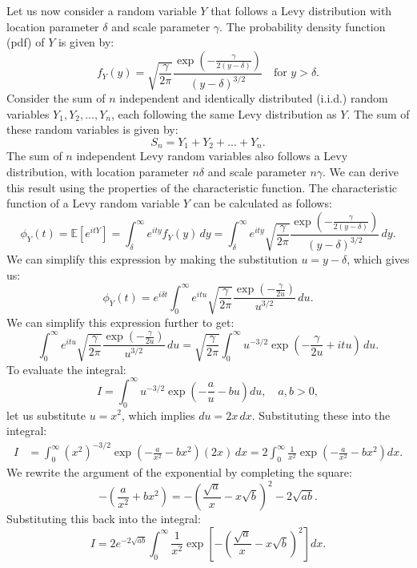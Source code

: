 \documentclass[12pt]{article}
\begin{document}
\begin{singlespace}
Let us now consider a random variable $Y$ that follows a Levy distribution with location parameter $\delta$ and scale parameter $\gamma$. The probability density function (pdf) of $Y$ is given by:
\[
f_Y(y) = \sqrt{\frac{\gamma}{2\pi}} \frac{\exp\left(-\frac{\gamma}{2(y-\delta)}\right)}{(y-\delta)^{3/2}} \quad \text{for } y > \delta.
\]
Consider the sum of $n$ independent and identically distributed (i.i.d.) random variables $Y_1, Y_2, ..., Y_n$, each following the same Levy distribution as $Y$. The sum of these random variables is given by:
\[
S_n = Y_1 + Y_2 + ... + Y_n.
\]
The sum of $n$ independent Levy random variables also follows a Levy distribution, with location parameter $n\delta$ and scale parameter $n\gamma$. We can derive this result using the properties of the characteristic function. The characteristic function of a Levy random variable $Y$ can be calculated as follows:
\[
\phi_Y(t) = \mathbb{E}[e^{itY}] = \int_{\delta}^{\infty} e^{ity} f_Y(y) \,dy = \int_{\delta}^{\infty} e^{ity} \sqrt{\frac{\gamma}{2\pi}} \frac{\exp\left(-\frac{\gamma}{2(y-\delta)}\right)}{(y-\delta)^{3/2}} \,dy.
\]
We can simplify this expression by making the substitution $u = y - \delta$, which gives us:
\[
\phi_Y(t) = e^{i\delta t} \int_{0}^{\infty} e^{itu} \sqrt{\frac{\gamma}{2\pi}} \frac{\exp\left(-\frac{\gamma}{2u}\right)}{u^{3/2}} \,du.
\]
 We can simplify this expression further to get:
\[
\int_{0}^{\infty} e^{itu} \sqrt{\frac{\gamma}{2\pi}} \frac{\exp\left(-\frac{\gamma}{2u}\right)}{u^{3/2}} \,du = \sqrt{\frac{\gamma}{2\pi}} \int_{0}^{\infty} u^{-3/2} \exp\left(-\frac{\gamma}{2u} + itu\right) \,du.
\]
To evaluate the integral:
\begin{equation}
I = \int_{0}^{\infty} u^{-3/2} \exp\left(-\frac{a}{u} - bu\right) du, \quad a, b > 0,
\end{equation}
let us substitute $u = x^2$, which implies $du = 2x \, dx$. Substituting these into the integral:
\begin{align}
I &= \int_{0}^{\infty} (x^2)^{-3/2} \exp\left(-\frac{a}{x^2} - bx^2\right) (2x) \, dx = 2 \int_{0}^{\infty} \frac{1}{x^2} \exp\left(-\frac{a}{x^2} - bx^2\right) dx.
\end{align}
We rewrite the argument of the exponential by completing the square:
\begin{equation}
-\left(\frac{a}{x^2} + bx^2\right) = -\left(\frac{\sqrt{a}}{x} - x\sqrt{b}\right)^2 - 2\sqrt{ab}.
\end{equation}
Substituting this back into the integral:
\begin{equation}
I = 2e^{-2\sqrt{ab}} \int_{0}^{\infty} \frac{1}{x^2} \exp\left[ -\left(\frac{\sqrt{a}}{x} - x\sqrt{b}\right)^2 \right] dx.

\end{equation}
\end{singlespace}
\end{document}
